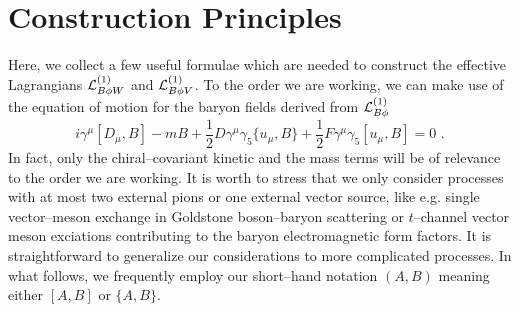 \section{Construction Principles}
\def\theequation{\Alph{section}.\arabic{equation}}
\setcounter{equation}{0}
\label{appa}

Here, we collect a few useful formulae which are needed to construct
the effective Lagrangians ${\cal L}^{(1)}_{B\phi W}$ and
${\cal L}^{(1)}_{B\phi V}$. To the order we are working, we can make
use of the  equation of motion for the baryon fields derived from
${\cal L}^{(1)}_{B\phi}$
\begin{equation}
i\gamma^\mu [D_\mu,B] - mB + \frac{1}{2} D \gamma^\mu \gamma_5\{u_\mu, B\}
+ \frac{1}{2} F \gamma^\mu \gamma_5 [u_\mu, B]  = 0 \, \, .
\label{eom}
\end{equation}
In fact, only the chiral--covariant kinetic and the mass terms will be
of relevance to the order we are working. It is worth to stress that
we only consider processes with at most two external pions or one
external vector source, like e.g. single vector--meson exchange in
Goldstone boson--baryon scattering or $t$--channel vector meson
exciations contributing to the baryon electromagnetic form factors. It
is straightforward to generalize our considerations to more
complicated processes. In what follows, we  frequently  employ our
short--hand notation $(A,B)$ meaning either $[A,B]$ or $\{A,B\}$.

